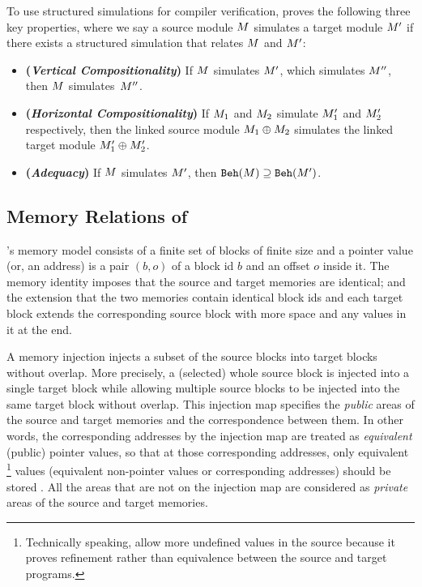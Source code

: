 To use structured simulations for compiler verification, \ccc{} proves
the following three key properties, where we say a source module
$M$ simulates a target module $M'$ if there exists a
structured simulation that relates $M$ and $M'$:
\begin{itemize}
\item \textbf{(\emph{Vertical Compositionality})}
  If $M$ simulates $M'$, which simulates $M''$,
  then $M$ simulates~$M''$.
\item \textbf{(\emph{Horizontal Compositionality})}
  If $M_1$ and $M_2$ simulate
     $M'_1$ and $M'_2$ respectively,
  then the linked source module  $M_1 \oplus M_2$ simulates
  the linked target module $M'_1 \oplus M'_2$.
\item \textbf{(\emph{Adequacy})}
  If $M$ simulates $M'$,
  then $\mathtt{Beh}({M}) \supseteq \mathtt{Beh}({M'})$.
\end{itemize}






\subsection{Memory Relations of \cc{}}
\label{sec:overview-verification:injection:original}
%
\cc{}'s memory model consists of a finite set of blocks of finite size
and a pointer value (or, an address) is a pair $(b,o)$ of a block id $b$ and an offset $o$ inside it.
The memory identity imposes that the source and target memories are identical;
and the extension that the two memories contain identical block ids and
each target block extends the corresponding source block
with more space and any values in it at the end.

A memory injection injects a subset of the source blocks into target blocks
without overlap. More precisely, a (selected) whole source block is injected into a single target block
while allowing multiple source blocks to be injected into the same target block without overlap.
This injection map specifies the \emph{public} areas of the source and target memories and the correspondence between them.
In other words, the corresponding addresses by the injection map are treated as \emph{equivalent} (public) pointer values,
so that at those corresponding addresses,
only equivalent%
\footnote{Technically speaking, \cc{} allow more undefined values in the source
  because it proves refinement rather than equivalence between the source and target programs.}
values (\ie equivalent non-pointer values or corresponding addresses) should be stored .
All the areas that are not on the injection map are considered as \emph{private} areas of the source and target memories.



